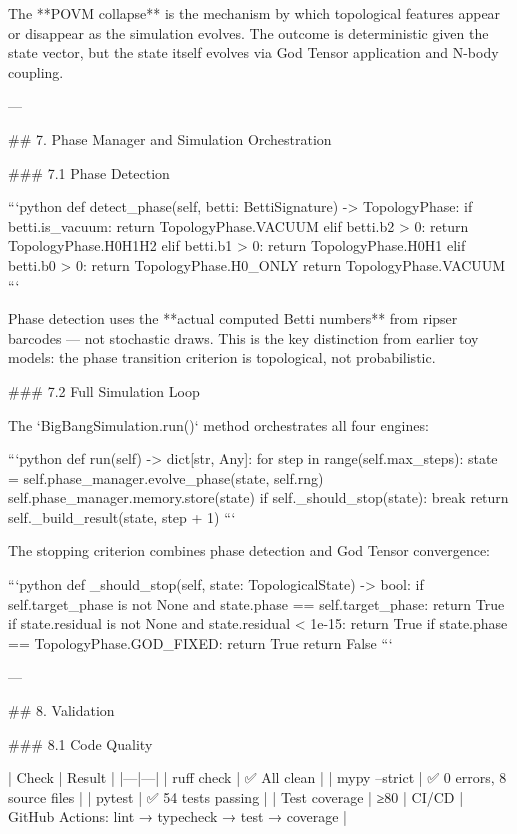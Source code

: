 The **POVM collapse** is the mechanism by which topological features appear or disappear as the simulation evolves.  The outcome is deterministic given the state vector, but the state itself evolves via God Tensor application and N-body coupling.

---

## 7. Phase Manager and Simulation Orchestration

### 7.1 Phase Detection

```python
def detect_phase(self, betti: BettiSignature) -> TopologyPhase:
    if betti.is_vacuum:
        return TopologyPhase.VACUUM
    elif betti.b2 > 0:
        return TopologyPhase.H0H1H2
    elif betti.b1 > 0:
        return TopologyPhase.H0H1
    elif betti.b0 > 0:
        return TopologyPhase.H0_ONLY
    return TopologyPhase.VACUUM
```

Phase detection uses the **actual computed Betti numbers** from ripser barcodes — not stochastic draws.  This is the key distinction from earlier toy models: the phase transition criterion is topological, not probabilistic.

### 7.2 Full Simulation Loop

The `BigBangSimulation.run()` method orchestrates all four engines:

```python
def run(self) -> dict[str, Any]:
    for step in range(self.max_steps):
        state = self.phase_manager.evolve_phase(state, self.rng)
        self.phase_manager.memory.store(state)
        if self._should_stop(state):
            break
    return self._build_result(state, step + 1)
```

The stopping criterion combines phase detection and God Tensor convergence:

```python
def _should_stop(self, state: TopologicalState) -> bool:
    if self.target_phase is not None and state.phase == self.target_phase:
        return True
    if state.residual is not None and state.residual < 1e-15:
        return True
    if state.phase == TopologyPhase.GOD_FIXED:
        return True
    return False
```

---

## 8. Validation

### 8.1 Code Quality

| Check | Result |
|---|---|
| ruff check | ✅ All clean |
| mypy --strict | ✅ 0 errors, 8 source files |
| pytest | ✅ 54 tests passing |
| Test coverage | ≥80%
| CI/CD | GitHub Actions: lint → typecheck → test → coverage |


